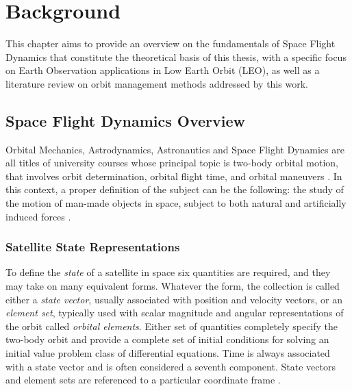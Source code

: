 \chapter{Background}

This chapter aims to provide an overview on the fundamentals of Space Flight Dynamics that constitute the theoretical basis of this thesis, with a specific focus on Earth Observation applications in Low Earth Orbit (LEO), as well as a literature review on orbit management methods addressed by this work.

\section{Space Flight Dynamics Overview}

Orbital Mechanics, Astrodynamics, Astronautics and Space Flight Dynamics are all titles of university courses whose principal topic is two-body orbital motion, that involves orbit determination, orbital flight time, and orbital maneuvers \cite{kluever2018space}.
In this context, a proper definition of the subject can be the following: the study of the motion of man-made objects in space, subject to both natural and artificially induced forces \cite{griffin2004space}.

\subsection{Satellite State Representations}

To define the \textit{state} of a satellite in space six quantities are required, and they may take on many equivalent forms.
Whatever the form, the collection is called either a \textit{state vector}, usually associated with position and velocity vectors, or an \textit{element set}, typically used with scalar magnitude and angular representations of the orbit called \textit{orbital elements}.
Either set of quantities completely specify the two-body orbit and provide a complete set of initial conditions for solving an initial value problem class of differential equations. 
Time is always associated with a state vector and is often considered a seventh component.
State vectors and element sets are referenced to a particular coordinate frame \cite{vallado2013fundamentals}. 

